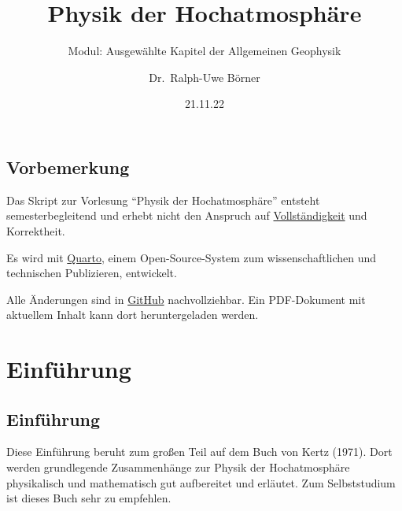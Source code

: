 \documentclass[
  a4paper,
  DIV=11]{scrreprt}
\title{Physik der Hochatmosphäre}
\subtitle{Modul: Ausgewählte Kapitel der Allgemeinen Geophysik}
\author{Dr.~Ralph-Uwe Börner}
\date{21.11.22}
\renewcommand*\contentsname{Inhaltsverzeichnis}
\newcommand\contentsname{Inhaltsverzeichnis}
\begin{document}
\maketitle
\ifdefined\Shaded\renewenvironment{Shaded}{\begin{tcolorbox}[interior hidden, frame hidden, boxrule=0pt, breakable, borderline west={3pt}{0pt}{shadecolor}, sharp corners, enhanced]}{\end{tcolorbox}}\fi

\renewcommand*\contentsname{Inhaltsverzeichnis}
{
\hypersetup{linkcolor=}
\setcounter{tocdepth}{2}
\tableofcontents
}

\hypertarget{vorbemerkung}{%
\chapter{Vorbemerkung}\label{vorbemerkung}}

Das Skript zur Vorlesung ``Physik der Hochatmosphäre'' entsteht
semesterbegleitend und erhebt nicht den Anspruch auf
\href{https://imgflip.com/i/6zt09v}{Vollständigkeit} und Korrektheit.

Es wird mit \href{http://quarto.org}{Quarto}, einem Open-Source-System
zum wissenschaftlichen und technischen Publizieren, entwickelt.

Alle Änderungen sind in \href{https://github.com/ruboerner/PDA}{GitHub}
nachvollziehbar. Ein PDF-Dokument mit aktuellem Inhalt kann dort
heruntergeladen werden.

\part{Einführung}

\hypertarget{einfuxfchrung-1}{%
\chapter{Einführung}\label{einfuxfchrung-1}}

Diese Einführung beruht zum großen Teil auf dem Buch von Kertz (1971).
Dort werden grundlegende Zusammenhänge zur Physik der Hochatmosphäre
physikalisch und mathematisch gut aufbereitet und erläutet. Zum
Selbststudium ist dieses Buch sehr zu empfehlen.
\end{document}
